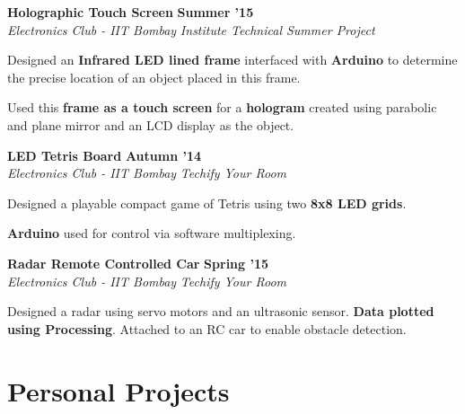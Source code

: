 \documentclass[11pt]{resume}
\begin{document}
\begin{resume}
\vspace{-1em}
\textbf{Holographic Touch Screen} \hfill \textbf{Summer '15}\\
\textsl{Electronics Club - IIT Bombay} \hfill \textsl{Institute Technical Summer Project}\\
\vspace{-4mm}
\begin{list2}
\item Designed an \textbf{Infrared LED lined frame} interfaced with \textbf{Arduino} to determine the precise location of an object placed in this frame.
\item Used this \textbf{frame as a touch screen} for a \textbf{hologram} created using parabolic and plane mirror and an LCD display as the object.
\end{list2}

\textbf{LED Tetris Board} \hfill \textbf{Autumn '14}\\
\textsl{Electronics Club - IIT Bombay} \hfill \textsl{Techify Your Room}\\
\vspace{-4mm}
\begin{list2}
\item Designed a playable compact game of Tetris using two \textbf{8x8 LED grids}.
\item \textbf{Arduino} used for control via software multiplexing.
\end{list2}

\textbf{Radar Remote Controlled Car} \hfill \textbf{Spring '15}\\
\textsl{Electronics Club - IIT Bombay} \hfill \textsl{Techify Your Room}\\
\vspace{-4mm}
\begin{list2}
\item Designed a radar using servo motors and an ultrasonic sensor. \textbf{Data plotted using Processing}. Attached to an RC car to enable obstacle detection.
\end{list2}


\section{\mysidestyle Personal Projects}


\end{resume}
\end{document}
